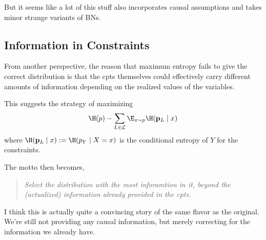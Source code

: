 \documentclass{article}
\begin{document}
	But it seems like a lot of this stuff also incorporates causal assumptions and takes minor strange variants of BNs.
	
	\subsection{Information in Constraints}
	From another perspective, the reason that maximum entropy fails to give the correct distribution is that the cpts themselves could effectively carry different amounts of information depending on the realized values of the variables. 
	
	
	This suggests the strategy of maximizing 
	\[ \H (p) - \sum_{L \in \mathcal L} \E_{x \sim p}  \H(\mathbf p_L \mid x)   \]
	where $\H(\mathbf p_L \mid x) := \H(p_Y \mid X = x)$ is the conditional entropy of $Y$ for the constraints. 
	
	The motto then becomes, 
	
	\begin{quote}
	\textit{Select the distribution with the most inforamtion in it, beyond the (actualized) information already provided in the cpts.}	
	\end{quote}
	
	I think this is actually quite a convincing story of the same flavor as the original. We're still not providing any causal information, but merely correcting for the information we already have. 
	
\end{document}
